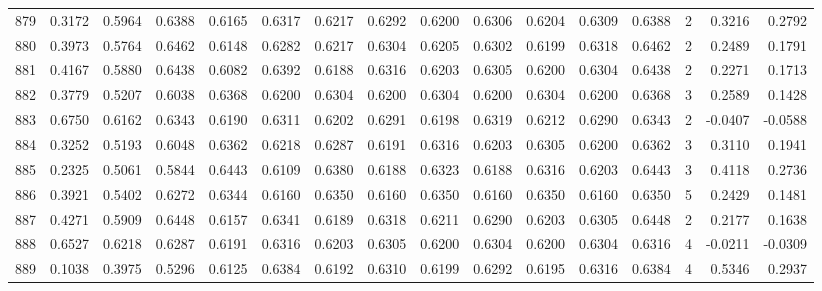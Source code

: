 \begin{tabular}{lrrrrrrrrrrrrrrr}
879 &      0.3172 &  0.5964 &  0.6388 &  0.6165 &  0.6317 &  0.6217 &  0.6292 &  0.6200 &  0.6306 &  0.6204 &   0.6309 &     0.6388 &      2 &                    0.3216 &                     0.2792 \\
880 &      0.3973 &  0.5764 &  0.6462 &  0.6148 &  0.6282 &  0.6217 &  0.6304 &  0.6205 &  0.6302 &  0.6199 &   0.6318 &     0.6462 &      2 &                    0.2489 &                     0.1791 \\
881 &      0.4167 &  0.5880 &  0.6438 &  0.6082 &  0.6392 &  0.6188 &  0.6316 &  0.6203 &  0.6305 &  0.6200 &   0.6304 &     0.6438 &      2 &                    0.2271 &                     0.1713 \\
882 &      0.3779 &  0.5207 &  0.6038 &  0.6368 &  0.6200 &  0.6304 &  0.6200 &  0.6304 &  0.6200 &  0.6304 &   0.6200 &     0.6368 &      3 &                    0.2589 &                     0.1428 \\
883 &      0.6750 &  0.6162 &  0.6343 &  0.6190 &  0.6311 &  0.6202 &  0.6291 &  0.6198 &  0.6319 &  0.6212 &   0.6290 &     0.6343 &      2 &                   -0.0407 &                    -0.0588 \\
884 &      0.3252 &  0.5193 &  0.6048 &  0.6362 &  0.6218 &  0.6287 &  0.6191 &  0.6316 &  0.6203 &  0.6305 &   0.6200 &     0.6362 &      3 &                    0.3110 &                     0.1941 \\
885 &      0.2325 &  0.5061 &  0.5844 &  0.6443 &  0.6109 &  0.6380 &  0.6188 &  0.6323 &  0.6188 &  0.6316 &   0.6203 &     0.6443 &      3 &                    0.4118 &                     0.2736 \\
886 &      0.3921 &  0.5402 &  0.6272 &  0.6344 &  0.6160 &  0.6350 &  0.6160 &  0.6350 &  0.6160 &  0.6350 &   0.6160 &     0.6350 &      5 &                    0.2429 &                     0.1481 \\
887 &      0.4271 &  0.5909 &  0.6448 &  0.6157 &  0.6341 &  0.6189 &  0.6318 &  0.6211 &  0.6290 &  0.6203 &   0.6305 &     0.6448 &      2 &                    0.2177 &                     0.1638 \\
888 &      0.6527 &  0.6218 &  0.6287 &  0.6191 &  0.6316 &  0.6203 &  0.6305 &  0.6200 &  0.6304 &  0.6200 &   0.6304 &     0.6316 &      4 &                   -0.0211 &                    -0.0309 \\
889 &      0.1038 &  0.3975 &  0.5296 &  0.6125 &  0.6384 &  0.6192 &  0.6310 &  0.6199 &  0.6292 &  0.6195 &   0.6316 &     0.6384 &      4 &                    0.5346 &                     0.2937 \\

\end{tabular}
